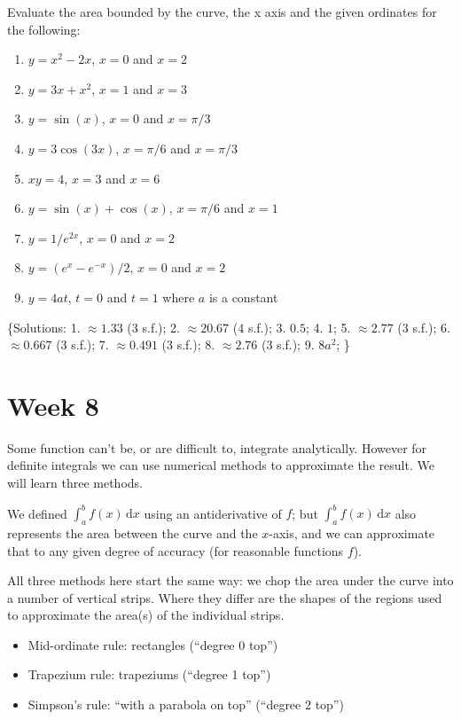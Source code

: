 \documentclass[
  english,
  11pt,
  oneside]{book}
\providecommand{\tightlist}{%
  \setlength{\itemsep}{0pt}\setlength{\parskip}{0pt}}
\newcommand{\slide}{}
\theoremstyle{definition}
\theoremstyle{definition}
\theoremstyle{definition}
\theoremstyle{definition}
\theoremstyle{remark}
\begin{document}
Evaluate the area bounded by the curve, the x axis and the given ordinates for the following:

\begin{enumerate}
\def\labelenumi{\arabic{enumi}.}
\tightlist
\item
  \(y=x^2-2x\), \(x=0\) and \(x=2\)
\item
  \(y=3x+x^2\), \(x=1\) and \(x=3\)
\item
  \(y=\sin(x)\), \(x=0\) and \(x=\pi/3\)
\item
  \(y=3\cos(3x)\), \(x=\pi/6\) and \(x=\pi/3\)
\item
  \(xy=4\), \(x=3\) and \(x=6\)
\item
  \(y=\sin(x)+\cos(x)\), \(x=\pi/6\) and \(x=1\)
\item
  \(y=1/e^{2x}\), \(x=0\) and \(x=2\)
\item
  \(y=(e^x-e^{-x})/2\), \(x=0\) and \(x=2\)
\item
  \(y=4at\), \(t=0\) and \(t=1\) where \(a\) is a constant
\end{enumerate}

\{Solutions:
1. \(\approx 1.33\) (\(3\) s.f.);
2. \(\approx 20.67\) (\(4\) s.f.);
3. \(0.5\);
4. \(1\);
5. \(\approx 2.77\) (\(3\) s.f.);
6. \(\approx 0.667\) (\(3\) s.f.);
7. \(\approx 0.491\) (\(3\) s.f.);
8. \(\approx 2.76\) (\(3\) s.f.);
9. \(8a^2\);
\}

\chapter{Week 8}\label{week-eight}

Some function can't be, or are difficult to, integrate analytically. However for definite integrals we can use numerical methods to approximate the result. We will learn three methods.

\slide

We defined \(\displaystyle\int_a^bf(x)\,\mathrm{d}x\) using an antiderivative of \(f\); but \(\displaystyle\int_a^bf(x)\,\mathrm{d}x\) also represents the area between the curve and the \(x\)-axis, and we can approximate that to any given degree of accuracy (for reasonable functions \(f\)).

All three methods here start the same way: we chop the area under the curve into a number of vertical strips. Where they differ are the shapes of the regions used to approximate the area(s) of the individual strips.

\begin{itemize}
\tightlist
\item
  Mid-ordinate rule: rectangles (``degree 0 top'')
\item
  Trapezium rule: trapeziums (``degree 1 top'')
\item
  Simpson's rule: ``with a parabola on top'' (``degree 2 top'')
\end{itemize}
\end{document}
